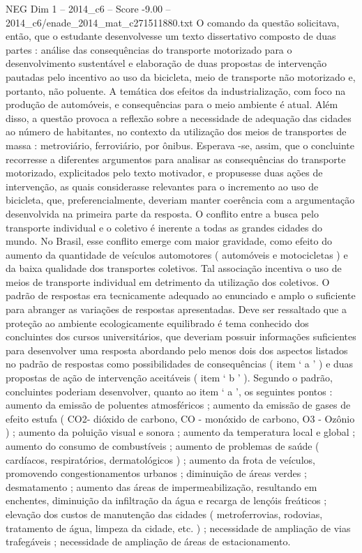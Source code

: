 \begin{textsample}{NEG Dim 1 – 2014\_c6 – Score -9.00 – 2014\_c6/enade\_2014\_mat\_c271511880.txt}
O comando da questão solicitava, então, que o estudante desenvolvesse um texto dissertativo composto de duas partes : análise das consequências do transporte motorizado para o desenvolvimento sustentável e elaboração de duas propostas de intervenção pautadas pelo incentivo ao uso da bicicleta, meio de transporte não motorizado e, portanto, não poluente.
A temática dos efeitos da industrialização, com foco na produção de automóveis, e consequências para o meio ambiente é atual.
Além disso, a questão provoca a reflexão sobre a necessidade de adequação das cidades ao número de habitantes, no contexto da utilização dos meios de transportes de massa : metroviário, ferroviário, por ônibus.
Esperava -se, assim, que o concluinte recorresse a diferentes argumentos para analisar as consequências do transporte motorizado, explicitados pelo texto motivador, e propusesse duas ações de intervenção, as quais considerasse relevantes para o incremento ao uso de bicicleta, que, preferencialmente, deveriam manter coerência com a argumentação desenvolvida na primeira parte da resposta.
O conflito entre a busca pelo transporte individual e o coletivo é inerente a todas as grandes cidades do mundo.
No Brasil, esse conflito emerge com maior gravidade, como efeito do aumento da quantidade de veículos automotores ( automóveis e motocicletas ) e da baixa qualidade dos transportes coletivos.
Tal associação incentiva o uso de meios de transporte individual em detrimento da utilização dos coletivos.
O padrão de respostas era tecnicamente adequado ao enunciado e amplo o suficiente para abranger as variações de respostas apresentadas.
Deve ser ressaltado que a proteção ao ambiente ecologicamente equilibrado é tema conhecido dos concluintes dos cursos universitários, que deveriam possuir informações suficientes para desenvolver uma resposta abordando pelo menos dois dos aspectos listados no padrão de respostas como possibilidades de consequências ( item ‘ a ’ ) e duas propostas de ação de intervenção aceitáveis ( item ‘ b ’ ).
Segundo o padrão, concluintes poderiam desenvolver, quanto ao item ‘ a ’, os seguintes pontos : aumento da emissão de poluentes atmosféricos ; aumento da emissão de gases de efeito estufa ( CO2- dióxido de carbono, CO - monóxido de carbono, O3 - Ozônio ) ; aumento da poluição visual e sonora ; aumento da temperatura local e global ; aumento do consumo de combustíveis ; aumento de problemas de saúde ( cardíacos, respiratórios, dermatológicos ) ; aumento da frota de veículos, promovendo congestionamentos urbanos ; diminuição de áreas verdes ; desmatamento ; aumento das áreas de impermeabilização, resultando em enchentes, diminuição da infiltração da água e recarga de lençóis freáticos ; elevação dos custos de manutenção das cidades ( metroferrovias, rodovias, tratamento de água, limpeza da cidade, etc. ) ; necessidade de ampliação de vias trafegáveis ; necessidade de ampliação de áreas de estacionamento.

\end{textsample}

